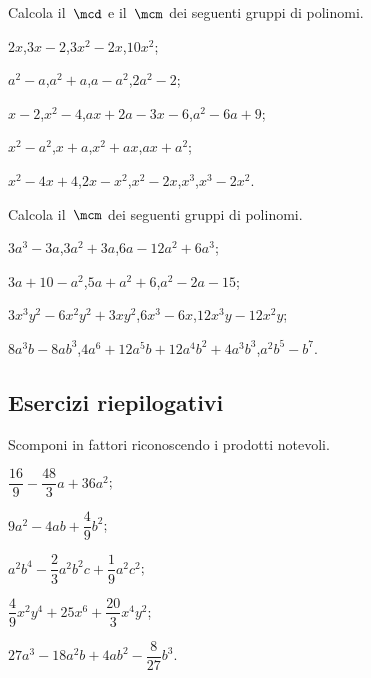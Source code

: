 \begin{esercizio}
\label{ese:13.98}
Calcola il~$\mcd$ e il~$\mcm$ dei seguenti gruppi di polinomi.
\begin{enumeratea}
 \item $2x$,\quad $3x-2$,\quad $3x^{2}-2x$,\quad $10x^{2}$;
 \item $a^{2}-a$,\quad $a^{2}+a$,\quad $a-a^{2}$,\quad $2a^{2}-2$;
 \item $x-2$,\quad $x^{2}-4$,\quad $ax+2a-3x-6$,\quad $a^{2}-6a+9$;
 \item $x^{2}-a^{2}$,\quad $x+a$,\quad $x^{2}+ax$,\quad $ax+a^{2}$;
 \item $x^{2}-4x+4$,\quad $2x-x^{2}$,\quad $x^{2}-2x$,\quad $x^{3}$,\quad $x^{3}-2x^{2}$.
\end{enumeratea}
\end{esercizio}

\begin{esercizio}[\Ast]
\label{ese:13.99}
Calcola il~$\mcm$ dei seguenti gruppi di polinomi.
\begin{enumeratea}
 \item $3a^{3}-3a$,\quad $3a^{2}+3a$,\quad $6a-12a^{2}+6a^{3}$;
 \item $3a+10-a^{2}$,\quad $5a+a^{2}+6$,\quad $a^{2}-2a-15$;
 \item $3x^{3}y^{2}-6x^{2}y^{2}+3xy^{2}$,\quad $6x^{3}-6x$,\quad $12x^{3}y-12x^{2}y$;
 \item $8a^{3}b-8ab^{3}$,\quad $4a^{6}+12a^{5}b+12a^{4}b^{2}+4a^{3}b^{3}$,\quad $a^{2}b^{5}-b^{7}$.
\end{enumeratea}
\end{esercizio}

\subsection{Esercizi riepilogativi}

\begin{esercizio}[\Ast]
\label{ese:13.100}
Scomponi in fattori riconoscendo i prodotti notevoli.
\begin{enumeratea}
 \item $\dfrac{16}{9}-\dfrac{48}{3}a+36a^{2}$;
 \item $9a^{2}-4ab+\dfrac{4}{9}b^{2}$;
 \item $a^{2}b^{4}-\dfrac{2}{3}a^{2}b^{2}c+\dfrac{1}{9}a^{2}c^{2}$;
 \item $\dfrac{4}{9}x^{2}y^{4}+25x^{6}+\dfrac{20}{3}x^{4}y^{2}$;
 \item $27a^{3}-18a^{2}b+4ab^{2}-\dfrac{8}{27}b^{3}$.
\end{enumeratea}
\end{esercizio}

